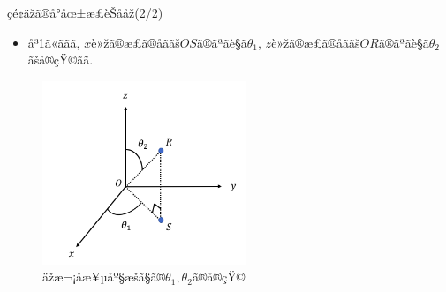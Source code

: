 \documentclass[dvipdfmx]{beamer} %
\begin{document}
\begin{frame}{çé¢äžã®å°åœ±æ­£èŠååž(2/2)}

\begin{itemize}
\item 
å³\ref{thetasample}ã«ããã, $x$è»žã®æ­£ã®åããš$OS$ã®ãªãè§ã$\theta_1$, $z$è»žã®æ­£ã®åããš$OR$ã®ãªãè§ã$\theta_2$ãšå®çŸ©ãã.
\end{itemize}

\vspace{-0.2cm}
\begin{figure}[tbp]
\begin{center}
\includegraphics[clip,height= 55mm]{data/theta_sample.png}
\end{center}
\caption{äžæ¬¡åæ¥µåº§æšã§ã®$\theta_1, \theta_2$ã®å®çŸ©}
\label{thetasample}
\end{figure}
\end{frame}
\end{document}
